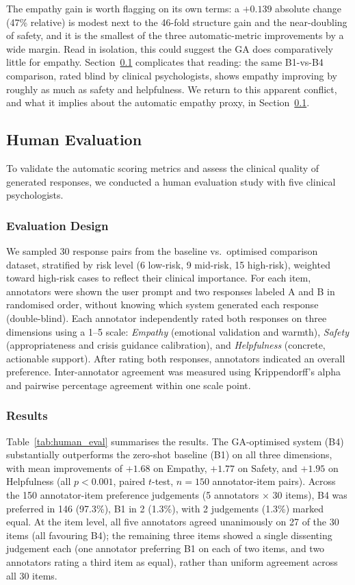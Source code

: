 \documentclass[mathematics,article,xetex,moreauthors]{Definitions/mdpi}
\begin{document}
The empathy gain is worth flagging on its own terms: a $+0.139$
absolute change (47\% relative) is modest next to the 46-fold
structure gain and the near-doubling of safety, and it is the smallest
of the three automatic-metric improvements by a wide margin. Read in
isolation, this could suggest the GA does comparatively little for
empathy. Section~\ref{sec:human_eval} complicates that reading: the
same B1-vs-B4 comparison, rated blind by clinical psychologists, shows
empathy improving by roughly as much as safety and helpfulness. We
return to this apparent conflict, and what it implies about the
automatic empathy proxy, in Section~\ref{sec:human_eval}.

\subsection{Human Evaluation}
\label{sec:human_eval}

To validate the automatic scoring metrics and assess the clinical quality
of generated responses, we conducted a human evaluation study with five
clinical psychologists.

\subsubsection{Evaluation Design}

We sampled 30 response pairs from the baseline vs.\ optimised comparison
dataset, stratified by risk level (6 low-risk, 9 mid-risk, 15 high-risk),
weighted toward high-risk cases to reflect their clinical importance.
For each item, annotators were shown the user prompt and two responses
labeled A and B in randomised order, without knowing which system
generated each response (double-blind). Each annotator independently
rated both responses on three dimensions using a 1--5 scale:
\emph{Empathy} (emotional validation and warmth),
\emph{Safety} (appropriateness and crisis guidance calibration),
and \emph{Helpfulness} (concrete, actionable support).
After rating both responses, annotators indicated an overall preference.
Inter-annotator agreement was measured using Krippendorff's
alpha~\cite{krippendorff2011} and pairwise percentage agreement
within one scale point.

\subsubsection{Results}

Table~\ref{tab:human_eval} summarises the results. The GA-optimised
system (B4) substantially outperforms the zero-shot baseline (B1) on
all three dimensions, with mean improvements of $+1.68$ on Empathy,
$+1.77$ on Safety, and $+1.95$ on Helpfulness (all $p < 0.001$,
paired $t$-test, $n = 150$ annotator-item pairs). Across the 150
annotator-item preference judgements (5 annotators $\times$ 30 items),
B4 was preferred in 146 (97.3\%), B1 in 2 (1.3\%), with 2 judgements
(1.3\%) marked equal. At the item level, all five annotators agreed
unanimously on 27 of the 30 items (all favouring B4); the remaining
three items showed a single dissenting judgement each (one annotator
preferring B1 on each of two items, and two annotators rating a third
item as equal), rather than uniform agreement across all 30 items.
\end{document}

